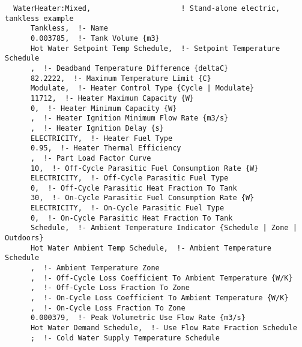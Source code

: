 \begin{lstlisting}
  WaterHeater:Mixed,                     ! Stand-alone electric, tankless example
      Tankless,  !- Name
      0.003785,  !- Tank Volume {m3}
      Hot Water Setpoint Temp Schedule,  !- Setpoint Temperature Schedule
      ,  !- Deadband Temperature Difference {deltaC}
      82.2222,  !- Maximum Temperature Limit {C}
      Modulate,  !- Heater Control Type {Cycle | Modulate}
      11712,  !- Heater Maximum Capacity {W}
      0,  !- Heater Minimum Capacity {W}
      ,  !- Heater Ignition Minimum Flow Rate {m3/s}
      ,  !- Heater Ignition Delay {s}
      ELECTRICITY,  !- Heater Fuel Type
      0.95,  !- Heater Thermal Efficiency
      ,  !- Part Load Factor Curve
      10,  !- Off-Cycle Parasitic Fuel Consumption Rate {W}
      ELECTRICITY,  !- Off-Cycle Parasitic Fuel Type
      0,  !- Off-Cycle Parasitic Heat Fraction To Tank
      30,  !- On-Cycle Parasitic Fuel Consumption Rate {W}
      ELECTRICITY,  !- On-Cycle Parasitic Fuel Type
      0,  !- On-Cycle Parasitic Heat Fraction To Tank
      Schedule,  !- Ambient Temperature Indicator {Schedule | Zone | Outdoors}
      Hot Water Ambient Temp Schedule,  !- Ambient Temperature Schedule
      ,  !- Ambient Temperature Zone
      ,  !- Off-Cycle Loss Coefficient To Ambient Temperature {W/K}
      ,  !- Off-Cycle Loss Fraction To Zone
      ,  !- On-Cycle Loss Coefficient To Ambient Temperature {W/K}
      ,  !- On-Cycle Loss Fraction To Zone
      0.000379,  !- Peak Volumetric Use Flow Rate {m3/s}
      Hot Water Demand Schedule,  !- Use Flow Rate Fraction Schedule
      ;  !- Cold Water Supply Temperature Schedule



\end{lstlisting}
